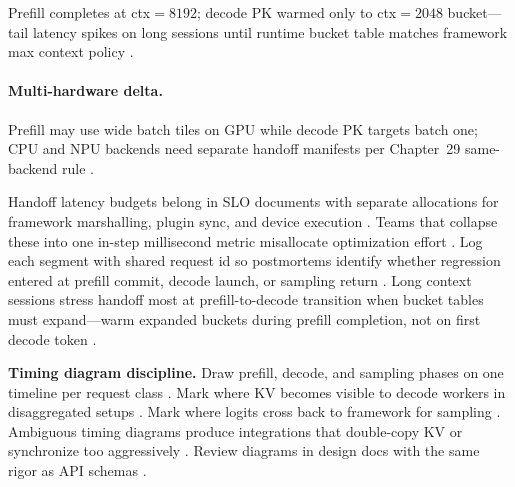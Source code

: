 \begin{example}
Prefill completes at ctx${=}8192$; decode PK warmed only to ctx${=}2048$ bucket---tail latency spikes on long sessions until runtime bucket table matches framework max context policy \citep{kwon2023vllm,memoryfloor2026,nvidia2024cudagraphs,yirage2026,chen2020compilerbasedhardw,patel2025llminference,dlbook}.
\end{example}

\paragraph{Multi-hardware delta.} Prefill may use wide batch tiles on GPU while decode PK targets batch one; CPU and NPU backends need separate handoff manifests per Chapter~29 same-backend rule \citep{amd2024xdna,amd2024aie,yirage2026,chen2020compilerbasedhardw,patel2025llminference,dlbook,semianalysis2024tma,taxbreak2026,memoryfloor2026,kwon2023vllm,nvidia2022hopper,dao2022flashattention,dao2023flashdecoding,nvidia2024cudagraphs,dlbook}.

Handoff latency budgets belong in SLO documents with separate allocations for framework marshalling, plugin sync, and device execution \citep{patel2025llminference,yirage2026,chen2020compilerbasedhardw,kwon2023vllm,dlbook}. Teams that collapse these into one in-step millisecond metric misallocate optimization effort \citep{patel2025llminference,yirage2026,chen2020compilerbasedhardw,dlbook}. Log each segment with shared request id so postmortems identify whether regression entered at prefill commit, decode launch, or sampling return \citep{kwon2023vllm,yirage2026,chen2020compilerbasedhardw,patel2025llminference,taxbreak2026,memoryfloor2026,dlbook}. Long context sessions stress handoff most at prefill-to-decode transition when bucket tables must expand---warm expanded buckets during prefill completion, not on first decode token \citep{kwon2023vllm,memoryfloor2026,nvidia2024cudagraphs,yirage2026,chen2020compilerbasedhardw,patel2025llminference,dlbook}.

\textbf{Timing diagram discipline.} Draw prefill, decode, and sampling phases on one timeline per request class \citep{patel2025llminference,kwon2023vllm,yirage2026,chen2020compilerbasedhardw,dlbook}. Mark where KV becomes visible to decode workers in disaggregated setups \citep{liu2024deepseekv3,kwon2023vllm,patel2025llminference,yirage2026,chen2020compilerbasedhardw,dlbook}. Mark where logits cross back to framework for sampling \citep{nvidia2024cudagraphs,kwon2023vllm,patel2025llminference,yirage2026,chen2020compilerbasedhardw,dlbook}. Ambiguous timing diagrams produce integrations that double-copy KV or synchronize too aggressively \citep{kwon2023vllm,memoryfloor2026,yirage2026,chen2020compilerbasedhardw,patel2025llminference,dlbook}. Review diagrams in design docs with the same rigor as API schemas \citep{patel2025llminference,yirage2026,chen2020compilerbasedhardw,dlbook}.

